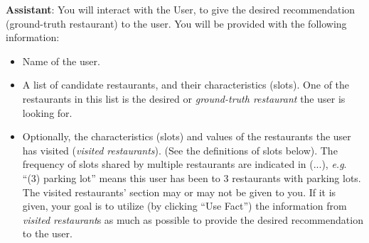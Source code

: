 \documentclass[11pt,a4paper]{article}
\makeatletter
\DeclareRobustCommand\onedot{\futurelet\@let@token\@onedot}
\def\onedot{. }
\def\eg{\emph{e.g}\onedot} \def\Eg{\emph{E.g}\onedot}
\makeatother
\begin{document}
\noindent \textbf{Assistant}: You will interact with the User, to give the desired recommendation (ground-truth restaurant) to the user. You will be provided with the following information:
\begin{itemize}
\itemsep0em
    \item Name of the user.
    \item A list of candidate restaurants, and their characteristics (slots). One of the restaurants in this list is the desired or \textit{ground-truth restaurant} the user is looking for.
    \item Optionally, the characteristics (slots) and values of the restaurants the user has visited (\textit{visited restaurants}). (See the definitions of slots below). The frequency of slots shared by multiple restaurants are indicated in (...), \eg ``(3) parking lot'' means this user has been to 3 restaurants with parking lots.
    The visited restaurants' section may or may not be given to you. If it is given, your goal is to utilize (by clicking ``Use Fact'') the information from \textit{visited restaurant}s as much as possible to provide the desired recommendation to the user. 
\end{itemize}
\end{document}
